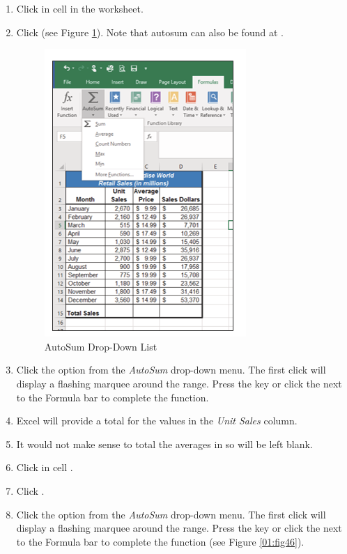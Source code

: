 \begin{enumbox}
	\begin{enumerate}
		\item Click in cell  in the  worksheet.
		\item Click  (see Figure \ref{01:fig45}). Note that autosum can also be found at .
	
		\begin{figure}[H]
			\centering
			\includegraphics[width=\maxwidth{.95\linewidth}]{gfx/ch01_fig45}
			\caption{AutoSum Drop-Down List}
			\label{01:fig45}
		\end{figure}

		\item Click the  option from the \textit{AutoSum} drop-down menu. The first click will display a flashing marquee around the range. Press the  key or click the  next to the Formula bar to complete the function.
		\item Excel will provide a total for the values in the \textit{Unit Sales} column.
		\item It would not make sense to total the averages in  so  will be left blank.
		\item Click in cell . 
		\item Click . 
		\item Click the  option from the \textit{AutoSum} drop-down menu. The first click will display a flashing marquee around the range. Press the  key or click the  next to the Formula bar to complete the function (see Figure \ref{01:fig46}).
	\end{enumerate}
\end{enumbox}

